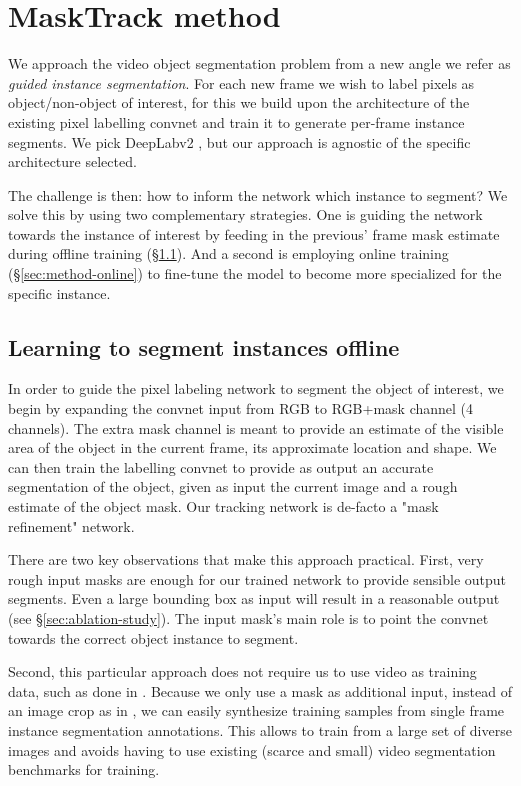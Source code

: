 \documentclass[10pt,twocolumn,letterpaper]{article}
\begin{document}
 \section{MaskTrack method}
\label{sec:method}

We approach the video object segmentation problem from a new angle we refer as \emph{guided instance segmentation}.
For each new frame we wish to label pixels as object/non-object of interest, for this we build upon the architecture of the existing pixel labelling convnet and
train it to generate per-frame instance segments.
We pick DeepLabv2 \cite{Chen2016ArxivDeeplabv2},
but our approach is agnostic of the specific architecture selected.

The challenge is then: how to inform the network which instance to segment?
We solve this by using two complementary strategies. One is guiding the network towards the instance of interest by feeding in the previous' frame mask estimate during offline training (\S\ref{sec:method-offline}).
And a second is employing online training (\S\ref{sec:method-online}) to fine-tune the model to become more specialized for the specific instance.



\subsection{Learning to segment instances offline}
\label{sec:method-offline}

In order to guide the pixel labeling network to segment the object of interest, we begin by expanding the convnet input from RGB to RGB+mask channel (4 channels).
The extra mask channel is meant to provide an estimate of the visible area of the object in the current frame, its approximate location and shape.
We can then train the labelling convnet to provide as output an accurate segmentation of the object, given as input the current image and a rough estimate of the object mask.
Our tracking network is de-facto a "mask refinement" network.

There are two key observations that make this approach practical. First, very rough input masks are enough for our trained network to provide sensible output segments.
Even a large bounding box as input will result in a reasonable output (see \S\ref{sec:ablation-study}). The input mask's main role is to point the convnet towards the correct object instance to segment.

Second, this particular approach does not require us to use video as training data, such as done in \cite{Held2016Eccv, Bertinetto2016Arxiv, Nam2016Cvpr}.
Because we only use a mask as additional input, instead of an image crop as in \cite{Held2016Eccv, Bertinetto2016Arxiv}, we can easily synthesize training samples from single frame instance segmentation annotations.
This allows to train from a large set of diverse images and avoids having to use existing (scarce and small) video segmentation benchmarks for training.
\end{document}
